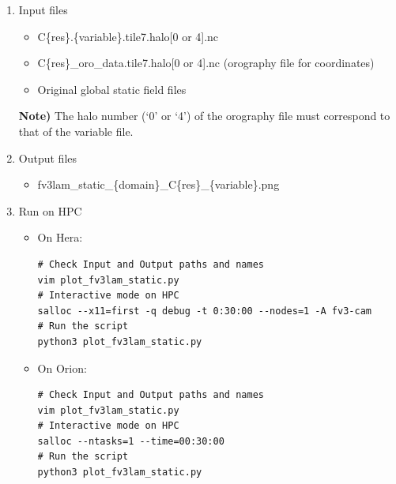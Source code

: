 \documentclass[11pt,fleqn]{report}              %
\begin{document}
\begin{enumerate}
\item Input files
\begin{itemize}
\item C\{res\}.\{variable\}.tile7.halo[0 or 4].nc
\item C\{res\}\_oro\_data.tile7.halo[0 or 4].nc (orography file for coordinates)
\item Original global static field files
\end{itemize}
{\bf Note)} The halo number (`0' or `4') of the orography file must correspond to that of the variable file.
\item Output files
\begin{itemize}
\item fv3lam\_static\_\{domain\}\_C\{res\}\_\{variable\}.png
\end{itemize}
\item Run on HPC

\begin{itemize}
\item On Hera:
\lstset{language=bash}   
\begin{lstlisting}[frame=trBL]
# Check Input and Output paths and names
vim plot_fv3lam_static.py
# Interactive mode on HPC
salloc --x11=first -q debug -t 0:30:00 --nodes=1 -A fv3-cam 
# Run the script
python3 plot_fv3lam_static.py
\end{lstlisting}

\item On Orion:
\lstset{language=bash}   
\begin{lstlisting}[frame=trBL]
# Check Input and Output paths and names
vim plot_fv3lam_static.py
# Interactive mode on HPC
salloc --ntasks=1 --time=00:30:00 
# Run the script
python3 plot_fv3lam_static.py
\end{lstlisting}

\end{itemize}



\end{enumerate}
\end{document}
